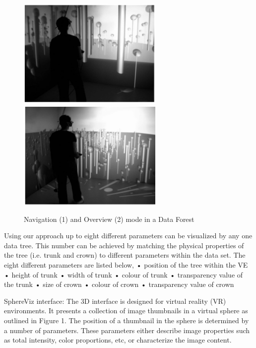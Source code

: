 \begin{figure}[h]
	\begin{center}
		\includegraphics[width=7cm]{03_Figures/05_LitReview/Jamieson2007_DataTree.png}
		\includegraphics[width=7cm]{03_Figures/05_LitReview/Jamieson2007_DataTreeOverview.png}
		\caption[Navigation and Overview mode in a Data Forest]{Navigation (1) and Overview (2) mode in a Data Forest \citep{Jamieson2007}}
		\label{fig:datatrees}
	\end{center}
\end{figure} 

Using our approach up to eight different parameters can be visualized by any one data tree. This number can be achieved by matching the physical properties of the tree (i.e. trunk and crown) to different parameters within the data set. The eight different parameters are listed below,
• position of the tree within the VE • height of trunk • width of trunk • colour of trunk • transparency value of the trunk • size of crown • colour of crown • transparency value of crown
\cite{Jamieson2007}

SphereViz interface: The 3D interface is designed for virtual reality (VR) environments. It presents a collection of image thumbnails in a virtual sphere as outlined in Figure 1. The position of a thumbnail in the sphere is determined by a number of parameters. These parameters either describe image properties such as total intensity, color proportions, etc, or characterize the image content.
\cite{Soldati2007}

